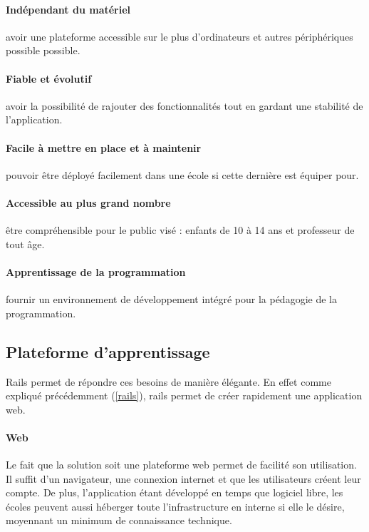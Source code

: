 \paragraph{Indépendant du matériel} avoir une plateforme accessible sur le plus d'ordinateurs et autres périphériques possible possible.
\paragraph{Fiable et évolutif} avoir la possibilité de rajouter des fonctionnalités tout en gardant une stabilité de l'application.
\paragraph{Facile à mettre en place et à maintenir} pouvoir être déployé facilement dans une école si cette dernière est équiper pour.
\paragraph{Accessible au plus grand nombre} être compréhensible pour le public visé : enfants de 10 à 14 ans et professeur de tout âge.
\paragraph{Apprentissage de la programmation} fournir un environnement de développement intégré pour la pédagogie de la programmation.

\subsection{Plateforme d'apprentissage}
Rails permet de répondre ces besoins de manière élégante. En effet comme expliqué précédemment (\ref{rails}), rails permet de créer rapidement une application web.



\paragraph{Web} Le fait que la solution soit une plateforme web permet de facilité son utilisation. Il suffit d'un navigateur, une connexion internet et que les utilisateurs créent leur compte. De plus, l'application étant développé en temps que logiciel libre, les écoles peuvent aussi héberger toute l'infrastructure en interne si elle le désire, moyennant un minimum de connaissance technique.


